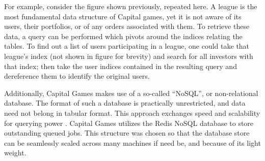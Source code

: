 For example, consider the figure shown previously, repeated here.
A league is the most fundamental data structure of Capital games,
yet it is not aware of its users, their portfolios, or of any
orders associated with them. To retrieve these data, a query can
be performed which pivots around the indices relating the tables.
To find out a list of users participating in a league, one could
take that league's index (not shown in figure for brevity) and
search for all investors with that index; then take the user
indices contained in the resulting query and dereference them
to identify the original users. 

Additionally, Capital Games makes use of a so-called ``NoSQL'',
or non-relational database. The format of such a database is
practically unrestricted, and data need not belong in tabular
format. This approach exchanges speed and scalability for
querying power \cite{wiki:nosql}. Capital Games utilizes the
Redis NoSQL database to store outstanding queued jobs. This
structure was chosen so that the database store can be
seamlessly scaled across many machines if need be, and
because of its light weight. 